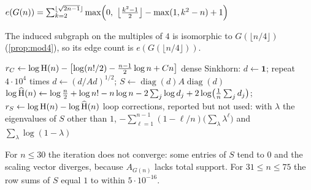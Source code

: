 \begin{algorithm}[h]
\caption{Edge count}\label{alg:edges}
\begin{algorithmic}[1]
\State \Return $e(G(n))=\sum_{k=2}^{\lfloor\sqrt{2n-1}\rfloor}\max\Bigl(0,\ \bigl\lfloor\tfrac{k^2-1}2\bigr\rfloor-\max(1,k^2-n)+1\Bigr)$
\end{algorithmic}
\end{algorithm}
The induced subgraph on the multiples of $4$ is isomorphic to $G(\lfloor n/4\rfloor)$ (\cref{prop:mod4}),
so its edge count is $e(G(\lfloor n/4\rfloor))$.

\begin{algorithm}[h]
\caption{Scaling predictor and residuals}\label{alg:predictor}
\begin{algorithmic}[1]
  \State $r_C\gets\log\mathrm{H}(n)-\bigl[\log(n!/2)-\frac{n-1}2\log n+Cn\bigr]$
    \State dense Sinkhorn: $d\gets\mathbf1$; repeat $4\cdot10^4$ times $d\gets(d/Ad)^{1/2}$; $S\gets\operatorname{diag}(d)A\operatorname{diag}(d)$
    \State $\log\widehat{\mathrm{H}}(n)\gets\log\frac n2+\log n!-n\log n-2\sum_j\log d_j+2\log\bigl(\frac1n\sum_jd_j\bigr)$; $r_S\gets\log\mathrm{H}(n)-\log\widehat{\mathrm{H}}(n)$
    \State loop corrections, reported but not used: with $\lambda$ the eigenvalues of $S$ other than $1$,
    \State \hspace{1.2em} $-\sum_{\ell=1}^{n-1}(1-\ell/n)\bigl(\sum_\lambda\lambda^\ell\bigr)$ and $\sum_\lambda\log(1-\lambda)$
  \EndIf
\EndFor
\end{algorithmic}
\end{algorithm}
For $n\le30$ the iteration does not converge: some entries of $S$ tend to $0$ and the scaling
vector diverges, because $A_{G(n)}$ lacks total support. For $31\le n\le75$ the row sums of $S$
equal $1$ to within $5\cdot10^{-16}$.
